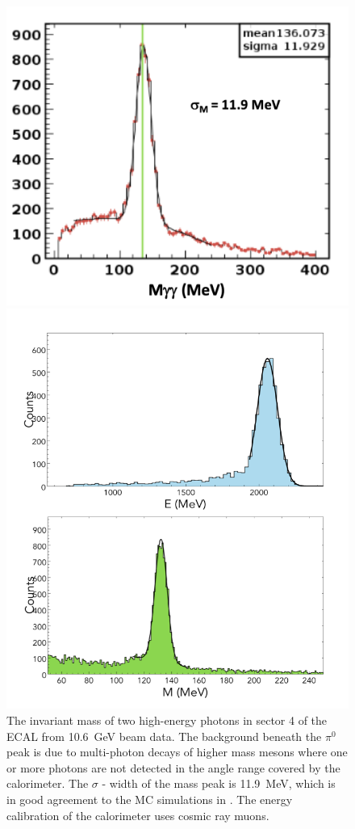 \documentclass[final,3p,twocolumn]{elsarticle}
\begin{document}
\begin{figure}[t!]
\centerline{\includegraphics[width=0.90\columnwidth]{ECAL-2g-mass-fit.png}}
\caption{The invariant mass of two high-energy photons in sector 4 of the ECAL from 10.6~GeV beam data. The
  background beneath the $\pi^0$ peak is due to multi-photon decays of higher mass mesons where one or more
  photons are not detected in the angle range covered by the calorimeter. The $\sigma$ - width of the mass peak is 11.9~MeV,
   which is in good agreement to the MC simulations in \cite{Software}. 
  The energy calibration of the calorimeter uses cosmic ray muons.}
\label{gg-ecal}
\centerline{\includegraphics[width=0.90\columnwidth]{FT-performance.png}}

\end{figure}
\end{document}
